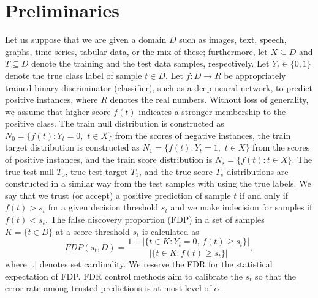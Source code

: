 \documentclass{article}
\begin{document}
\section{Preliminaries}

Let us suppose that we are given a domain $D$ such as images, text, speech, graphs, time series, tabular data, or the mix of these; furthermore, let $X\subseteq D$ and $T\subseteq D$ denote the training and  the test data samples, respectively. Let $Y_t\in\{0,1\}$ denote the true class label of sample $t\in D$. Let $f:D\rightarrow R$ be appropriately trained binary discriminator (classifier), such as a deep neural network, to predict positive instances, where $R$ denotes the real numbers. Without loss of generality, we assume that higher score $f(t)$ indicates a stronger membership to the positive class. The train null distribution is constructed as $N_0=\{f(t):Y_t = 0,\,\,  t\in X\}$ from the scores of negative instances, the train target distribution is constructed as $N_1=\{f(t): Y_t = 1,\,\,  t\in X\}$ from the scores of positive instances, and the train score distribution is $N_s=\{f(t): t\in X\}$. The true test null $T_0$, true test target $T_1$, and the true score $T_s$ distributions are constructed in a similar way from the test samples with using the true labels. We say that we trust (or accept) a positive prediction of sample $t$ if and only if $f(t)>s_t$ for a given decision threshold  $s_t$ and we make indecision for samples if $f(t) < s_t$. The false discovery proportion (FDP) in a set of samples $K=\{t\in D\}$ at a score threshold $s_t$ is calculated as 
\begin{equation*}
	FDP(s_t,D)=\frac{1+|\{t\in K: Y_t=0,\,f(t)\ge s_t\}|}{|\{t\in K:f(t)\ge s_t\}|},
\end{equation*}
\noindent where $|.|$ denotes set cardinality. We reserve the FDR for the statistical expectation of FDP. FDR control methods aim to calibrate the $s_t$ so that the error rate among trusted predictions is at most level of $\alpha$. %

\end{document}
